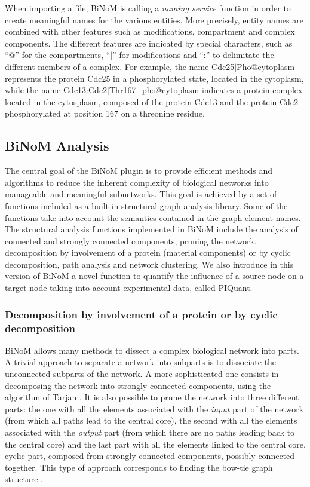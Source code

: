 \documentclass[10pt]{bmc_article}
\newenvironment{bmcformat}{\baselineskip20pt\sloppy\setboolean{publ}{false}}{\baselineskip20pt\sloppy}
\begin{document}
\begin{bmcformat}
When importing a file, BiNoM is calling a \emph{naming service} function in
order to create meaningful names for the various entities. More precisely,
entity names are combined with other features such as modifications, compartment
and complex components. The different features are indicated by special
characters, such as ``@'' for the compartments, ``$|$'' for modifications and
``:'' to delimitate the different members of a complex. For example, the
name Cdc25$|$Pho@cytoplasm represents the protein Cdc25 in a phosphorylated
state, located in the cytoplasm, while the name
Cdc13:Cdc2$|$Thr167\_pho@cytoplasm indicates a protein complex located in the
cytosplasm, composed of the protein Cdc13 and the protein Cdc2 phosphorylated at
position 167 on a threonine residue.


\subsection*{BiNoM Analysis}
The central goal of the BiNoM plugin is to provide efficient methods
and algorithms to reduce the inherent complexity of biological networks into
manageable and meaningful subnetworks. This goal is achieved by a set of
functions included as a built-in structural graph analysis library. Some of the functions take into
account the semantics contained in the graph element names.
The structural analysis functions implemented in BiNoM include the analysis of
connected and strongly connected components, pruning the network, decomposition
by involvement of a protein (material components) or by cyclic decomposition, path analysis and network clustering.
We also introduce in this version of BiNoM a novel function to quantify the
influence of a source node on a target node taking into account experimental data, called PIQuant.

\subsubsection*{Decomposition by involvement of a protein or by cyclic decomposition}

BiNoM allows many methods to dissect a complex biological network into parts.
A trivial approach to separate a network into subparts is to dissociate the unconnected subparts
of the network. A more sophisticated one consists in decomposing the network into
strongly connected components, using the algorithm of Tarjan
\cite{tarjan1972depth}. It is also possible to prune the network into three different parts:
the one with all the elements associated with the \emph{input} part of the network (from which all paths lead to the central core), the
second with all the elements associated with the \emph{output} part (from which there are no paths leading back to the central core) and the last
part with all the elements linked to the central core, cyclic part, composed from strongly connected components, possibly connected together. 
This type of approach corresponds to finding the bow-tie graph structure \cite{broder2000graph}.


\end{bmcformat}
\end{document}
